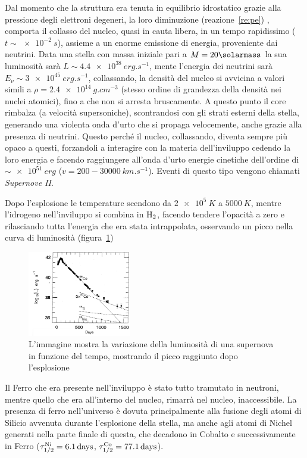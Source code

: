 Dal momento che la struttura era tenuta in equilibrio idrostatico grazie alla pressione degli elettroni degeneri, la loro diminuzione (reazione~\ref{re:pe}) , comporta il collasso del nucleo, quasi in cauta libera, in un tempo rapidissimo ($t \sim \SI{e-2}{s}$), assieme a un enorme emissione di energia, proveniente dai neutrini. Data una stella con massa iniziale pari a $M = 20\si{\solarmass}$ la sua luminosità sarà $L \sim \SI{4.4e38}{erg.s^{-1}}$, mente l'energia dei neutrini sarà $E_\nu \sim \SI{3e45}{erg.s^{-1}}$, collassando, la densità del nucleo si avvicina a valori simili a $\rho = \SI{2.4e14}{g.cm^{-3}}$ (stesso ordine di grandezza della densità nei nuclei atomici), fino a che non si arresta bruscamente. A questo punto il core rimbalza (a velocità supersoniche), scontrandosi con gli strati esterni della stella, generando una violenta onda d'urto che si propaga velocemente, anche grazie alla presenza di neutrini. Questo perché il nucleo, collassando, diventa sempre più opaco a questi, forzandoli a interagire con la materia dell'inviluppo cedendo la loro energia e facendo raggiungere all'onda d'urto energie cinetiche dell'ordine di $\sim \SI{e51}{erg}$ ($v = 200-\SI{30000}{km.s^{-1}}$). Eventi di questo tipo vengono chiamati \emph{Supernove II}.

Dopo l'esplosione le temperature scendono da $\SI{2e5}{K}$ a $\SI{5000}{K}$, mentre l'idrogeno nell'inviluppo si combina in $\textup{H}_2$, facendo tendere l'opacità a zero e rilasciando tutta l'energia che era stata intrappolata, osservando un picco nella curva di luminosità (figura~\ref{fig:supernova})
\begin{figure}
    \centering
    \includegraphics[width = 0.4\textwidth]{immagini/supernova.png}
    \caption{L'immagine mostra la variazione della luminosità di una supernova in funzione del tempo, mostrando il picco raggiunto dopo l'esplosione}\label{fig:supernova}
\end{figure}

Il Ferro che era presente nell'inviluppo è stato tutto tramutato in neutroni, mentre quello che era all'interno del nucleo, rimarrà nel nucleo, inaccessibile. La presenza di ferro nell'universo è dovuta principalmente alla fusione degli atomi di Silicio avvenuta durante l'esplosione della stella, ma anche agli atomi di Nichel generati nella parte finale di questa, che decadono in Cobalto e successivamente in Ferro ($\tau_{1/2}^\textup{Ni} = \SI{6.1}{days}$, $\tau_{1/2}^\textup{Co} = \SI{77.1}{days}$).
